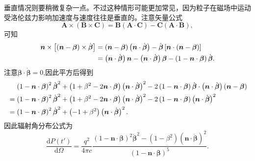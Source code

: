 \documentclass[../天体物理基础.tex]{subfiles}
\begin{document}
垂直情况则要稍微复杂一点。不过这种情形可能更加常见，因为粒子在磁场中运动受洛伦兹力影响加速度与速度往往是垂直的。注意矢量公式
\begin{equation}
\boldsymbol{A}\times\left(\boldsymbol{B}\times\boldsymbol{C}\right)=\boldsymbol{B}\left(\boldsymbol{A}\cdot\boldsymbol{C}\right)-\boldsymbol{C}\left(\boldsymbol{A}\cdot\boldsymbol{B}\right),
\end{equation}
可知
\begin{align}
\boldsymbol{n}\times\left[\left(\boldsymbol{n}-\boldsymbol{\beta}\right)\times\dot{\boldsymbol{\beta}}\right]&=\left(\boldsymbol{n}-\boldsymbol{\beta}\right)\left(\boldsymbol{n}\cdot\dot{\boldsymbol{\beta}}\right)-\dot{\boldsymbol{\beta}}\left[\boldsymbol{n}\cdot\left(\boldsymbol{n}-\boldsymbol{\beta}\right)\right]\notag\\
&=\left(\boldsymbol{n}\cdot\dot{\boldsymbol{\beta}}\right)\boldsymbol{n}-\left(\boldsymbol{n}\cdot\dot{\boldsymbol{\beta}}\right)\boldsymbol{\beta}-\left(1-\boldsymbol{n}\cdot\boldsymbol{\beta}\right)\dot{\boldsymbol{\beta}}.
\end{align}
注意$\boldsymbol{\beta}\cdot\dot{\boldsymbol{\beta}}=0$,因此平方后得到
\begin{align}
&\quad\,\left(1-\boldsymbol{n}\cdot\boldsymbol{\beta}\right)^{2}\dot{\boldsymbol{\beta}}^{2}+\left(1+\beta^{2}-2\boldsymbol{n}\cdot\boldsymbol{\beta}\right)\left(\boldsymbol{n}\cdot\dot{\boldsymbol{\beta}}\right)^{2}-2\left(1-\boldsymbol{n}\cdot\boldsymbol{\beta}\right)\dot{\boldsymbol{\beta}}\cdot\left(\boldsymbol{n}\cdot\dot{\boldsymbol{\beta}}\right)\left(\boldsymbol{n}-\boldsymbol{\beta}\right)\notag\\
&=\left(1-\boldsymbol{n}\cdot\boldsymbol{\beta}\right)^{2}\dot{\boldsymbol{\beta}}^{2}+\left(1+\beta^{2}-2\boldsymbol{n}\cdot\boldsymbol{\beta}\right)\left(\boldsymbol{n}\cdot\dot{\boldsymbol{\beta}}\right)^{2}-2\left(1-\boldsymbol{n}\cdot\boldsymbol{\beta}\right)\left(\boldsymbol{n}\cdot\dot{\boldsymbol{\beta}}\right)^{2}\notag\\
&=\left(1-\boldsymbol{n}\cdot\boldsymbol{\beta}\right)^{2}\dot{\boldsymbol{\beta}}^{2}+\left(-1+\beta^{2}\right)\left(\boldsymbol{n}\cdot\dot{\boldsymbol{\beta}}\right)^{2}.
\end{align}
因此辐射角分布公式为
\begin{equation}
\frac{\mathrm{d}P\left(t'\right)}{\mathrm{d}\Omega}=\frac{q^{2}}{4\pi c}\frac{\left(1-\boldsymbol{n}\cdot\boldsymbol{\beta}\right)^{2}\dot{\boldsymbol{\beta}}^{2}-\left(1-\beta^{2}\right)\left(\boldsymbol{n}\cdot\dot{\boldsymbol{\beta}}\right)^{2}}{\left(1-\boldsymbol{n}\cdot\boldsymbol{\beta}\right)^{5}}.
\end{equation}
\end{document}
